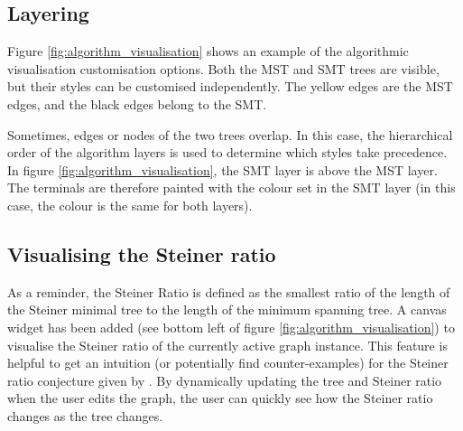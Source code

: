 \documentclass{l4proj}
\begin{document}
\subsection{Layering}
Figure \ref{fig:algorithm_visualisation} shows an example of the algorithmic visualisation customisation options. Both the MST and SMT trees are visible, but their styles can be customised independently. The yellow edges are the MST edges, and the black edges belong to the SMT.

Sometimes, edges or nodes of the two trees overlap. In this case, the hierarchical order of the algorithm layers is used to determine which styles take precedence. In figure \ref{fig:algorithm_visualisation}, the SMT layer is above the MST layer. The terminals are therefore painted with the colour set in the SMT layer (in this case, the colour is the same for both layers).
\subsection{Visualising the Steiner ratio}
As a reminder, the Steiner Ratio is defined as the smallest ratio of the length of the Steiner minimal tree to the length of the minimum spanning tree.
A canvas widget has been added (see bottom left of figure \ref{fig:algorithm_visualisation}) to visualise the Steiner ratio of the currently active graph instance.
This feature is helpful to get an intuition (or potentially find counter-examples) for the Steiner ratio conjecture given by \cite{Gilbert1968SteinerMT}. By dynamically updating the tree and Steiner ratio when the user edits the graph, the user can quickly see how the Steiner ratio changes as the tree changes.
\end{document}
